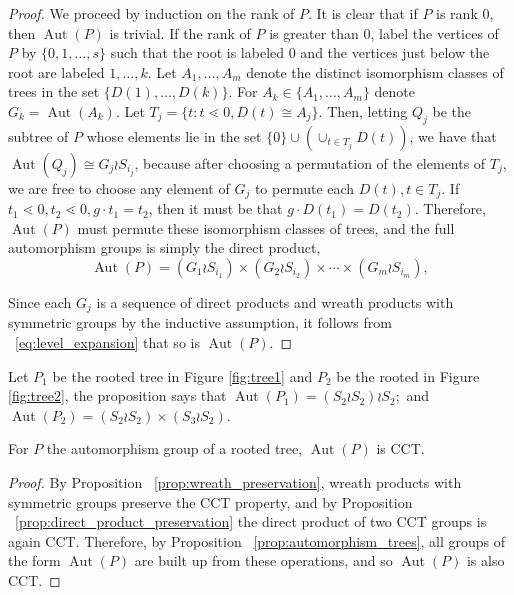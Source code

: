 \documentclass[smallextended, envcountsame, numbook]{svjour3}
\numberwithin{equation}{section}
\newcommand\Aut{\operatorname{Aut}}
\begin{document}
\begin{proof}
We proceed by induction on the rank of $P$.  It is clear that if $P$ is rank 0, then $\Aut(P)$ is trivial.  If the rank of $P$ is greater than 0, label the vertices of $P$ by $\{0,1,\ldots, s\}$ such that the root is labeled $0$ and the vertices just below the root are labeled $1, \ldots, k$. Let $A_1,\ldots, A_m$ denote the distinct isomorphism classes of trees in the set $\{D(1),\ldots, D(k)\}$. For $A_k \in \{A_1,\ldots,A_m\}$ denote $G_k = \Aut(A_k)$. 
Let $T_j = \{t\colon t\lessdot 0,D(t) \cong A_j\}$. Then, letting $Q_j$ be the subtree of $P$ whose elements lie in the set $\{0\} \cup (\cup_{t \in T_j} D(t))$, we have that $\Aut(Q_j) \cong G_j \wr S_{i_j}$, because after choosing a permutation of the elements of $T_j$, we are free to choose any element of $G_j$ to permute each $D(t),t \in T_j$. If $t_1 \lessdot 0,t_2 \lessdot 0,g \cdot t_1 = t_2$, then it must be that $g \cdot D(t_1) = D(t_2)$. Therefore, $\Aut(P)$ must permute these isomorphism classes of trees, and the full automorphism groups is simply the direct product, 
\begin{equation}
\Aut(P) = (G_1 \wr S_{i_1}) \times (G_2 \wr S_{i_2}) \times \cdots \times (G_m\wr S_{i_m}),
\end{equation}

Since each $G_j$ is a sequence of direct products and wreath products with symmetric groups by the inductive assumption, it follows from ~\eqref{eq:level_expansion} that so is $\Aut(P)$.
\end{proof}

\begin{example}
Let $P_1$ be the rooted tree  in Figure \ref{fig:tree1} and $P_2$ be the rooted in Figure \ref{fig:tree2}, the proposition says that $\Aut (P_1) = (S_2 \wr S_2)\wr S_2;$ and $\Aut(P_2) = (S_2 \wr S_2) \times (S_3 \wr S_2) $. 
\end{example}

\begin{corollary}
\label{cor:tree_cct}
For $P$ the automorphism group of a rooted tree, $\Aut(P)$ is CCT.
\end{corollary}
\begin{proof}
By Proposition ~\ref{prop:wreath_preservation}, wreath products with symmetric groups preserve the CCT property, and by Proposition ~\ref{prop:direct_product_preservation} the direct product of two CCT groups is again CCT. Therefore, by Proposition ~\ref{prop:automorphism_trees}, all groups of the form $\Aut(P)$ are built up from these operations, and so $\Aut(P)$ is also CCT.
\end{proof}
\end{document}
